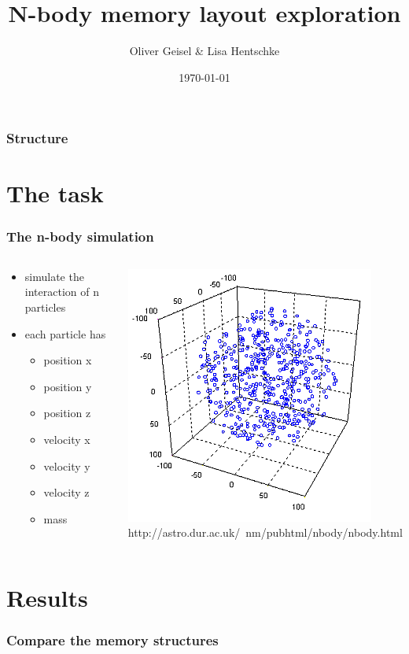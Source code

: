 \documentclass[aspectratio=169]{beamer}
\title{N-body memory layout exploration}
\author{Oliver Geisel \& Lisa Hentschke}
\date{\today}
\begin{document}
\begin{frame}
	\titlepage
\end{frame}

\begin{frame}
	\frametitle{Structure}
	\tableofcontents
\end{frame}

\section{The task} 
\begin{frame}
	\frametitle{The n-body simulation}
	\begin{columns}
	\begin{column}{0.6\textwidth}
		\begin{itemize}
			\item simulate the interaction of n particles
			\item each particle has
			\begin{itemize}
				\smallskip
				\item position x
				\item position y
				\item position z
				\smallskip
				\item velocity x
				\item velocity y
				\item velocity z
				\smallskip
				\item mass
			\end{itemize}
		\end{itemize}
	\end{column}
	
	\begin{column}{0.4\textwidth}
		\includegraphics[scale=0.65]{resources/nbody.png}
		\tiny http://astro.dur.ac.uk/~nm/pubhtml/nbody/nbody.html
	\end{column}
	
	\end{columns}
	
\end{frame}

\section{Results} 
\begin{frame}
	\frametitle{Compare the memory structures}
	
\end{frame}
\end{document}
